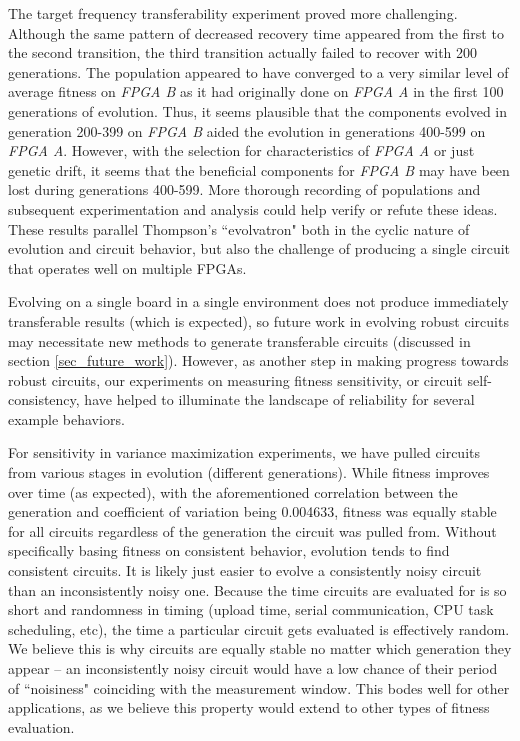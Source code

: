 \documentclass{ieeeaccess}
\begin{document}
The target frequency transferability experiment proved more challenging. Although the same pattern of decreased recovery time appeared from the first to the second transition, the third transition actually failed to recover with 200 generations. The population appeared to have converged to a very similar level of average fitness on \textit{FPGA B} as it had originally done on \textit{FPGA A} in the first 100 generations of evolution. Thus, it seems plausible that the components evolved in generation 200-399 on \textit{FPGA B} aided the evolution in generations 400-599 on \textit{FPGA A}. However, with the selection for characteristics of \textit{FPGA A} or just genetic drift, it seems that the beneficial components for  \textit{FPGA B} may have been lost during generations 400-599. More thorough recording of populations and subsequent experimentation and analysis could help verify or refute these ideas. These results parallel Thompson's ``evolvatron" \cite{Thompson1998OnEvolution} both in the cyclic nature of evolution and circuit behavior, but also the challenge of producing a single circuit that operates well on multiple FPGAs.


Evolving on a single board in a single environment does not produce immediately transferable results (which is expected), so future work in evolving robust circuits may necessitate new methods to generate transferable circuits (discussed in section \ref{sec_future_work}). However, as another step in making progress towards robust circuits, our experiments on measuring fitness sensitivity, or circuit self-consistency, have helped to illuminate the landscape of reliability for several example behaviors.


For sensitivity in variance maximization experiments, we have pulled circuits from various stages in evolution (different generations). While fitness improves over time (as expected), with the aforementioned correlation between the generation and coefficient of variation being 0.004633, fitness was equally stable for all circuits regardless of the generation the circuit was pulled from. Without specifically basing fitness on consistent behavior, evolution tends to find consistent circuits. It is likely just easier to evolve a consistently noisy circuit than an inconsistently noisy one. Because the time circuits are evaluated for is so short and randomness in timing (upload time, serial communication, CPU task scheduling, etc), the time a particular circuit gets evaluated is effectively random. We believe this is why circuits are equally stable no matter which generation they appear -- an inconsistently noisy circuit would have a low chance of their period of ``noisiness" coinciding with the measurement window. This bodes well for other applications, as we believe this property would extend to other types of fitness evaluation.
\end{document}
